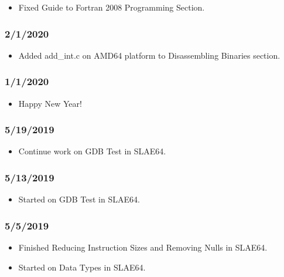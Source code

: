 \begin{itemize}
\item Fixed Guide to Fortran 2008 Programming Section.
\end{itemize}

\subsubsection{2/1/2020}

\begin{itemize}
\item Added add\_int.c on AMD64 platform to Disassembling Binaries section.
\end{itemize}

\subsubsection{1/1/2020}

\begin{itemize}
\item Happy New Year!
\end{itemize}

\subsubsection{5/19/2019}

\begin{itemize}
\item Continue work on GDB Test in SLAE64.
\end{itemize}

\subsubsection{5/13/2019}

\begin{itemize}
\item Started on GDB Test in SLAE64.
\end{itemize}

\subsubsection{5/5/2019}

\begin{itemize}
\item Finished Reducing Instruction Sizes and Removing Nulls in SLAE64.
\item Started on Data Types in SLAE64.
\end{itemize}

